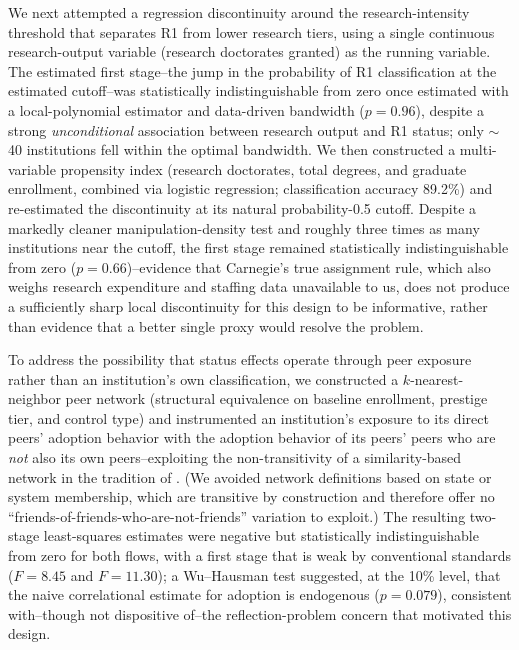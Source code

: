 \documentclass[11pt, letterpaper]{article}
\newcommand{\textcite}[1]{\cite{#1}}
\begin{document}
We next attempted a regression discontinuity around the research-intensity threshold that separates R1 from lower research tiers, using a single continuous research-output variable (research doctorates granted) as the running variable. The estimated first stage--the jump in the probability of R1 classification at the estimated cutoff--was statistically indistinguishable from zero once estimated with a local-polynomial estimator and data-driven bandwidth ($p=0.96$), despite a strong \emph{unconditional} association between research output and R1 status; only $\sim$40 institutions fell within the optimal bandwidth. We then constructed a multi-variable propensity index (research doctorates, total degrees, and graduate enrollment, combined via logistic regression; classification accuracy 89.2\%) and re-estimated the discontinuity at its natural probability-0.5 cutoff. Despite a markedly cleaner manipulation-density test and roughly three times as many institutions near the cutoff, the first stage remained statistically indistinguishable from zero ($p=0.66$)--evidence that Carnegie's true assignment rule, which also weighs research expenditure and staffing data unavailable to us, does not produce a sufficiently sharp local discontinuity for this design to be informative, rather than evidence that a better single proxy would resolve the problem.

To address the possibility that status effects operate through peer exposure rather than an institution's own classification, we constructed a $k$-nearest-neighbor peer network (structural equivalence on baseline enrollment, prestige tier, and control type) and instrumented an institution's exposure to its direct peers' adoption behavior with the adoption behavior of its peers' peers who are \emph{not} also its own peers--exploiting the non-transitivity of a similarity-based network in the tradition of \textcite{bramoulle2009}. (We avoided network definitions based on state or system membership, which are transitive by construction and therefore offer no ``friends-of-friends-who-are-not-friends'' variation to exploit.) The resulting two-stage least-squares estimates were negative but statistically indistinguishable from zero for both flows, with a first stage that is weak by conventional standards ($F=8.45$ and $F=11.30$); a Wu--Hausman test suggested, at the 10\% level, that the naive correlational estimate for adoption is endogenous ($p=0.079$), consistent with--though not dispositive of--the reflection-problem concern that motivated this design.
\end{document}
